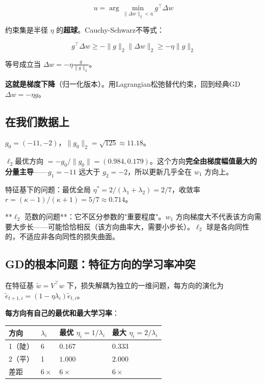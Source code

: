 \documentclass[12pt,a4paper]{article}
\begin{document}
\[u = \arg\min_{\|\Delta w\|_2 < \eta} g^\top \Delta w\]

约束集是半径 $\eta$ 的\textbf{超球}。Cauchy-Schwarz不等式：


\[g^\top \Delta w \ge -\|g\|_2 \|\Delta w\|_2 \ge -\eta\|g\|_2\]

等号成立当 $\Delta w = -\eta \frac{g}{\|g\|_2}$。

\textbf{这就是梯度下降}（归一化版本）。用Lagrangian松弛替代约束，回到经典GD $\Delta w = -\eta g$。


\subsection{在我们数据上}

$g_0 = (-11, -2)$，$\|g_0\|_2 = \sqrt{125} \approx 11.18$。

$\ell_2$最优方向 $= -g_0/\|g_0\| = (0.984, 0.179)$。这个方向\textbf{完全由梯度幅值最大的分量主导}——$g_1 = -11$ 远大于 $g_2 = -2$，所以更新几乎全在 $w_1$ 方向上。

特征基下的问题：最优全局 $\eta^* = 2/(\lambda_1+\lambda_2) = 2/7$，收敛率 $r = (\kappa-1)/(\kappa+1) = 5/7 \approx 0.714$。

**$\ell_2$ 范数的问题**：它不区分参数的"重要程度"。$w_1$ 方向梯度大不代表该方向需要大步长——可能恰恰相反（该方向曲率大，需要小步长）。$\ell_2$ 球是各向同性的，不适应非各向同性的损失曲面。



\subsection{GD的根本问题：特征方向的学习率冲突}

在特征基 $\tilde{w} = V^\top w$ 下，损失解耦为独立的一维问题，每方向的演化为 $\tilde{e}_{t+1,i} = (1 - \eta\lambda_i)\tilde{e}_{t,i}$。

\textbf{每方向有自己的最优和最大学习率}：






\begin{center}\small
\begin{longtable}{|l|l|l|l|}
\hline
方向 & $\lambda_i$ & 最优 $\eta_i = 1/\lambda_i$ & 最大 $\eta_i = 2/\lambda_i$ \\
\hline
1（陡） & 6 & $0.167$ & $0.333$ \\
2（平） & 1 & $1.000$ & $2.000$ \\
差距 & $6\times$ & $6\times$ & $6\times$ \\
\hline
\end{longtable}
\end{center}
\end{document}
